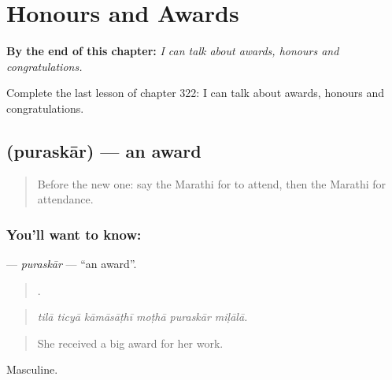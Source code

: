 
\chapter{Honours and Awards}
\label{ch:mr-honours-and-awards}

\begin{chapteropening}
\textbf{By the end of this chapter:} \emph{I can talk about awards, honours and congratulations.}

Complete the last lesson of chapter 322: I can talk about awards, honours and congratulations.
\end{chapteropening}

\section[\texorpdfstring{\mr{पुरस्कार} (puraskār)}{पुरस्कार (puraskār)}]{ (puraskār) — an award}

\label{lesson:MR-C322-puraskar}



\begin{quote}
Before the new one: say the Marathi for to attend, then the Marathi for attendance.
\end{quote}

\subsection*{You'll want to know: }
\textbf{} — \emph{puraskār} — \textquotedblleft{}an award\textquotedblright{}.

\begin{quote}
     .
\end{quote}

\begin{quote}
\emph{tilā ticyā kāmāsāṭhī moṭhā puraskār miḷālā.}
\end{quote}

\begin{quote}
She received a big award for her work.
\end{quote}

Masculine.

